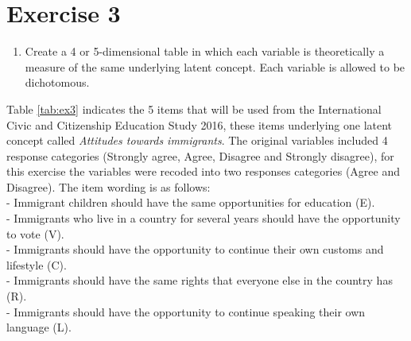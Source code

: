 \documentclass[
  12pt,
]{article}
\providecommand{\tightlist}{%
  \setlength{\itemsep}{0pt}\setlength{\parskip}{0pt}}
\begin{document}
\newpage

\hypertarget{exercise-3}{%
\section{Exercise 3}\label{exercise-3}}

\begin{enumerate}
\def\labelenumi{\arabic{enumi}.}
\tightlist
\item
  Create a 4 or 5-dimensional table in which each variable is theoretically a measure of the same underlying latent concept. Each variable is allowed to be dichotomous.
\end{enumerate}

Table \ref{tab:ex3} indicates the 5 items that will be used from the International Civic and Citizenship Education Study 2016, these items underlying one latent concept called \emph{Attitudes towards immigrants}. The original variables included 4 response categories (Strongly agree, Agree, Disagree and Strongly disagree), for this exercise the variables were recoded into two responses categories (Agree and Disagree). The item wording is as follows: \\
- Immigrant children should have the same opportunities for education (E).\\
- Immigrants who live in a country for several years should have the opportunity to vote (V).\\
- Immigrants should have the opportunity to continue their own customs and lifestyle (C).\\
- Immigrants should have the same rights that everyone else in the country has (R).\\
- Immigrants should have the opportunity to continue speaking their own language (L).
\end{document}

